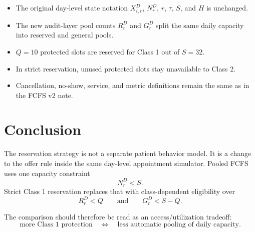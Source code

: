 \documentclass[11pt]{article}
\begin{document}
\begin{reviewbox}[title={Review Against the Implemented Reserved-Slot Model}]
\begin{itemize}[nosep]
    \item The original day-level state notation \(X_{i,r}^{D}\), \(N_r^D\), \(r\), \(\tau\), \(S\), and \(H\) is unchanged.
    \item The new audit-layer pool counts \(R_r^D\) and \(G_r^D\) split the same daily capacity into reserved and general pools.
    \item \(Q=10\) protected slots are reserved for Class 1 out of \(S=32\).
    \item In strict reservation, unused protected slots stay unavailable to Class 2.
    \item Cancellation, no-show, service, and metric definitions remain the same as in the FCFS v2 note.
\end{itemize}
\end{reviewbox}

\section{Conclusion}

The reservation strategy is not a separate patient behavior model. It is a change to the offer
rule inside the same day-level appointment simulator. Pooled FCFS uses one capacity constraint
\[
N_r^D<S.
\]
Strict Class 1 reservation replaces that with class-dependent eligibility over
\[
R_r^D<Q
\qquad\text{and}\qquad
G_r^D<S-Q.
\]

The comparison should therefore be read as an access/utilization tradeoff:
\[
\text{more Class 1 protection}
\quad\Longleftrightarrow\quad
\text{less automatic pooling of daily capacity}.
\]
\end{document}
